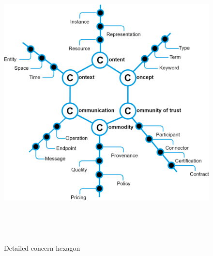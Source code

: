 \begin{figure}[H]
	\begin{Center}
          \includegraphics[width=6.53in,height=5.96in]{./media/image53.png}
		\caption{Detailed concern hexagon}
		\label{fig:Detailed_concern_hexagon}
	\end{Center}
\end{figure}




